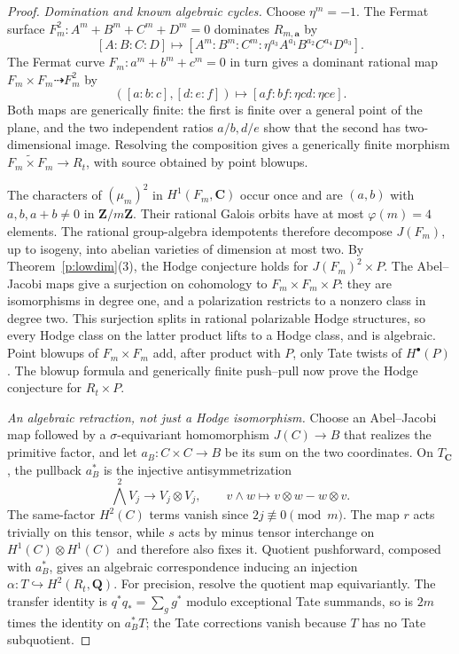 \documentclass[11pt,reqno]{article}
\theoremstyle{emphasizedplain}
\theoremstyle{emphasizeddefinition}
\theoremstyle{emphasizeddefinition}
\newcommand{\Q}{\mathbf Q}
\newcommand{\C}{\mathbf C}
\newcommand{\Z}{\mathbf Z}
\begin{document}
\begin{proof}
\emph{Domination and known algebraic cycles.} Choose $\eta^m=-1$. The Fermat surface
$F_m^2:A^m+B^m+C^m+D^m=0$ dominates $R_{m,\boldsymbol a}$ by
\[
 [A:B:C:D]\longmapsto
 [A^m:B^m:C^m:\eta^{a_3} A^{a_1}B^{a_2}C^{a_4}D^{a_3}].
\]
The Fermat curve $F_m:a^m+b^m+c^m=0$ in turn gives a dominant
rational map $F_m\times F_m\dashrightarrow F_m^2$ by
\[
 ([a:b:c],[d:e:f])\longmapsto[af:bf:\eta cd:\eta ce].
\]
Both maps are generically finite: the first is finite over a general
point of the plane, and the two independent ratios $a/b,d/e$
show that the second has two-dimensional image. Resolving the
composition gives a generically finite morphism
$\widetilde{F_m\times F_m}\to R_t$, with source obtained by
point blowups.

The characters of $(\mu_m)^2$ in $H^1(F_m,\C)$ occur once and
are $(a,b)$ with $a,b,a+b\ne0$ in $\Z/m\Z$. Their rational
Galois orbits have at most $\varphi(m)=4$ elements. The rational
group-algebra idempotents therefore decompose $J(F_m)$, up to
isogeny, into abelian varieties of dimension at most two.
By Theorem~\ref{p:lowdim}(3), the Hodge conjecture holds for
$J(F_m)^2\times P$. The Abel--Jacobi maps give a surjection on
cohomology to $F_m\times F_m\times P$: they are isomorphisms in
degree one, and a polarization restricts to a nonzero class in
degree two. This surjection splits in rational polarizable Hodge
structures, so every Hodge class on the latter product lifts to a
Hodge class, and is algebraic. Point blowups of $F_m\times F_m$
add, after product with $P$, only Tate twists of $H^\bullet(P)$.
The blowup formula and generically finite push--pull now prove
the Hodge conjecture for $R_t\times P$.

\emph{An algebraic retraction, not just a Hodge isomorphism.}
Choose an Abel--Jacobi map followed by a $\sigma$-equivariant homomorphism
$J(C)\to B$ that realizes the primitive factor, and let
$a_B:C\times C\to B$ be its sum on the two coordinates.
On $T_\C$, the pullback $a_B^*$ is the injective antisymmetrization
\[
 \bigwedge^2 V_j\longrightarrow V_j\otimes V_j,
 \qquad v\wedge w\longmapsto v\otimes w-w\otimes v.
\]
The same-factor $H^2(C)$ terms vanish since $2j\not\equiv0\pmod m$.
The map $r$ acts trivially on this tensor, while $s$ acts by minus
tensor interchange on $H^1(C)\otimes H^1(C)$ and therefore also
fixes it. Quotient pushforward, composed with $a_B^*$, gives an
algebraic correspondence inducing an injection
$\alpha:T\hookrightarrow H^2(R_t,\Q)$.
For precision, resolve the quotient map equivariantly. The transfer
identity is $q^*q_*=\sum_g g^*$ modulo exceptional Tate summands,
so is $2m$ times the identity on $a_B^*T$; the Tate corrections
vanish because $T$ has no Tate subquotient.


\end{proof}
\end{document}
